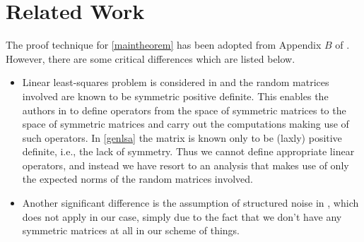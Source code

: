 \section{Related Work}
\label{sec:related}
The proof technique for \cref{maintheorem} has been adopted from Appendix $B$ of \cite{bachharder} . However, there are some critical differences which are listed below.
\begin{itemize}
\item Linear least-squares problem is considered in \cite{bachharder} and the random matrices involved are known to be symmetric positive definite. This enables the authors in \cite{bachharder} to define operators from the space of symmetric matrices to the space of symmetric matrices and carry out the computations making use of such operators. In \cref{genlsa} the matrix is known only to be (laxly) positive definite, i.e., the lack of symmetry.
Thus we cannot define appropriate linear operators, and instead we have resort to an analysis that makes use of only the expected norms of the random matrices involved.
\item Another significant difference is the assumption of structured noise in \cite{bachharder}, which does not apply in our case, simply due to the fact that we don't have any symmetric matrices at all in our scheme of things.
\end{itemize}
